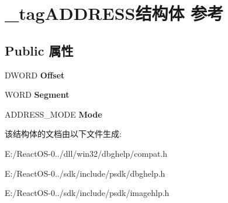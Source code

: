 \hypertarget{struct__tag_a_d_d_r_e_s_s}{}\section{\+\_\+tag\+A\+D\+D\+R\+E\+S\+S结构体 参考}
\label{struct__tag_a_d_d_r_e_s_s}
\subsection*{Public 属性}
\begin{DoxyCompactItemize}
\item 
\mbox{\label{struct__tag_a_d_d_r_e_s_s_ae02a081ff727ae5e4e73784261ab1206}} 
D\+W\+O\+RD {\bfseries Offset}
\item 
\mbox{\label{struct__tag_a_d_d_r_e_s_s_acdfc86e489f3e0db1a5066c67daf97f7}} 
W\+O\+RD {\bfseries Segment}
\item 
\mbox{\label{struct__tag_a_d_d_r_e_s_s_a5aba75cbcf52f4b6c754d58ddc06d60f}} 
A\+D\+D\+R\+E\+S\+S\+\_\+\+M\+O\+DE {\bfseries Mode}
\end{DoxyCompactItemize}


该结构体的文档由以下文件生成\+:\begin{DoxyCompactItemize}
\item 
E\+:/\+React\+O\+S-\/0../dll/win32/dbghelp/compat.\+h\item 
E\+:/\+React\+O\+S-\/0../sdk/include/psdk/dbghelp.\+h\item 
E\+:/\+React\+O\+S-\/0../sdk/include/psdk/imagehlp.\+h\end{DoxyCompactItemize}
